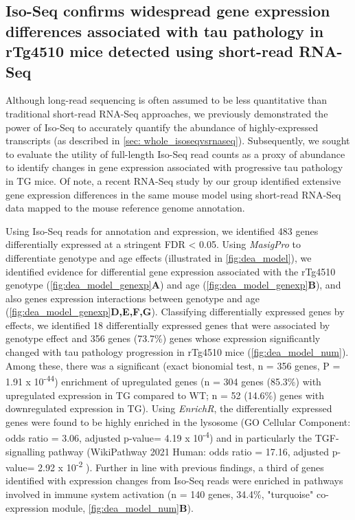 \subsection{Iso-Seq confirms widespread gene expression differences associated with tau pathology in rTg4510 mice detected using short-read RNA-Seq}
\label{ch5: diffgeneexp}
Although long-read sequencing is often assumed to be less quantitative than traditional short-read RNA-Seq approaches, we previously demonstrated the power of Iso-Seq to accurately quantify the abundance of highly-expressed transcripts (as described in \cref{sec: whole_isoseqvsrnaseq}). Subsequently, we sought to evaluate the utility of full-length Iso-Seq read counts as a proxy of abundance to identify changes in gene expression associated with progressive tau pathology in TG mice. Of note, a recent RNA-Seq study by our group identified extensive gene expression differences in the same mouse model using short-read RNA-Seq data mapped to the mouse reference genome annotation\cite{Castanho2020}.

Using Iso-Seq reads for annotation and expression, we identified 483 genes differentially expressed at a stringent FDR < 0.05. Using \textit{MasigPro} to differentiate genotype and age effects (illustrated in \cref{fig:dea_model}), we identified evidence for differential gene expression associated with the rTg4510 genotype (\cref{fig:dea_model_genexp}\textbf{A}) and age (\cref{fig:dea_model_genexp}\textbf{B}), and also genes expression interactions between genotype and age (\cref{fig:dea_model_genexp}\textbf{D,E,F,G}). Classifying differentially expressed genes by effects, we identified 18 differentially expressed genes that were associated by genotype effect and 356 genes (73.7\%) genes whose expression significantly changed with tau pathology progression in rTg4510 mice (\cref{fig:dea_model_num}). Among these, there was a significant (exact bionomial test, n = 356 genes, P = 1.91 x 10\textsuperscript{-44}) enrichment of upregulated genes (n = 304 genes (85.3\%) with upregulated expression in TG compared to WT; n = 52 (14.6\%) genes with downregulated expression in TG). Using \textit{EnrichR}, the differentially expressed genes were found to be highly enriched in the lysosome (GO Cellular Component: odds ratio = 3.06, adjusted p-value= 4.19 x 10\textsuperscript{-4}) and in particularly the TGF-\textbeta signalling pathway (WikiPathway 2021 Human: odds ratio = 17.16, adjusted p-value= 2.92 x 10\textsuperscript{-2} ). Further in line with previous findings, a third of genes identified with expression changes from Iso-Seq reads were enriched in pathways involved in immune system activation (n = 140 genes, 34.4\%, "turquoise" co-expression module\cite{Castanho2020}, \cref{fig:dea_model_num}\textbf{B}). 

